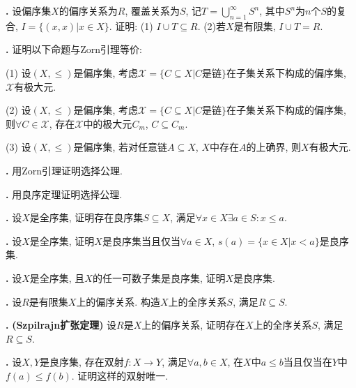 \par \textbf{\theprobpar .} 设偏序集$X$的偏序关系为$R$, 覆盖关系为$S$, 记$T=\bigcup_{n=1}^\infty S^n$, 其中$S^n$为$n$个$S$的复合, $I=\{(x,x)\vert x\in X\}$. 证明: (1) $I\cup T\subseteq R$. (2)若$X$是有限集, $I\cup T=R$.

\par \textbf{\theprobpar .} \cite{NST} 证明以下命题与Zorn引理等价:
\par (1) 设$(X, \le)$是偏序集, 考虑$\mathcal{X}=\{C\subseteq X\vert C\text{是链}\}$在子集关系下构成的偏序集, $\mathcal{X}$有极大元. 
\par (2) 设$(X, \le)$是偏序集, 考虑$\mathcal{X}=\{C\subseteq X\vert C\text{是链}\}$在子集关系下构成的偏序集, 则$\forall C\in \mathcal{X}$, 存在$\mathcal{X}$中的极大元$C_m$, $C\subseteq C_m$. 
\par (3) 设$(X,\le)$是偏序集, 若对任意链$A\subseteq X$, $X$中存在$A$的上确界, 则$X$有极大元. 

\par \textbf{\theprobpar .} 用Zorn引理证明选择公理. 

\par \textbf{\theprobpar .} 用良序定理证明选择公理.


\par \textbf{\theprobpar .} \cite{NST}设$X$是全序集, 证明存在良序集$S\subseteq X$, 满足$\forall x\in X\exists a\in S: x\le a$. 

\par \textbf{\theprobpar .} \cite{NST}设$X$是全序集, 证明$X$是良序集当且仅当$\forall a\in X$, $s(a)=\{x\in X\vert x<a\}$是良序集. 

\par \textbf{\theprobpar .} \cite{NST} 设$X$是全序集, 且$X$的任一可数子集是良序集, 证明$X$是良序集. 

\par \textbf{\theprobpar .} \cite{IC} 设$R$是有限集$X$上的偏序关系. 构造$X$上的全序关系$S$, 满足$R\subseteq S$. 

\par \textbf{\theprobpar .} \textbf{(Szpilrajn扩张定理)} 设$R$是$X$上的偏序关系, 证明存在$X$上的全序关系$S$, 满足$R\subseteq S$. 

\par \textbf{\theprobpar .} \cite{NST}设$X,Y$是良序集, 存在双射$f:X\to Y$, 满足$\forall a,b\in X$, 在$X$中$a\le b$当且仅当在$Y$中$f(a)\le f(b)$. 证明这样的双射唯一. 

